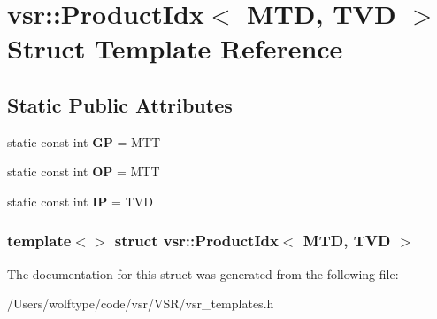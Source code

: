 \hypertarget{structvsr_1_1_product_idx_3_01_m_t_d_00_01_t_v_d_01_4}{\section{vsr\-:\-:Product\-Idx$<$ M\-T\-D, T\-V\-D $>$ Struct Template Reference}
\label{structvsr_1_1_product_idx_3_01_m_t_d_00_01_t_v_d_01_4}
}
\subsection*{Static Public Attributes}
\begin{DoxyCompactItemize}
\item 
\hypertarget{structvsr_1_1_product_idx_3_01_m_t_d_00_01_t_v_d_01_4_ae3eaf9290b3aae48ab69817af5a55e5c}{static const int {\bfseries G\-P} = M\-T\-T}\label{structvsr_1_1_product_idx_3_01_m_t_d_00_01_t_v_d_01_4_ae3eaf9290b3aae48ab69817af5a55e5c}

\item 
\hypertarget{structvsr_1_1_product_idx_3_01_m_t_d_00_01_t_v_d_01_4_a86fe2fa4a9035429ea62bcc4aad9b15e}{static const int {\bfseries O\-P} = M\-T\-T}\label{structvsr_1_1_product_idx_3_01_m_t_d_00_01_t_v_d_01_4_a86fe2fa4a9035429ea62bcc4aad9b15e}

\item 
\hypertarget{structvsr_1_1_product_idx_3_01_m_t_d_00_01_t_v_d_01_4_adb7d794991acb814fb41151c84d92f7c}{static const int {\bfseries I\-P} = T\-V\-D}\label{structvsr_1_1_product_idx_3_01_m_t_d_00_01_t_v_d_01_4_adb7d794991acb814fb41151c84d92f7c}

\end{DoxyCompactItemize}
\subsubsection*{template$<$$>$ struct vsr\-::\-Product\-Idx$<$ M\-T\-D, T\-V\-D $>$}



The documentation for this struct was generated from the following file\-:\begin{DoxyCompactItemize}
\item 
/\-Users/wolftype/code/vsr/\-V\-S\-R/vsr\-\_\-templates.\-h\end{DoxyCompactItemize}
